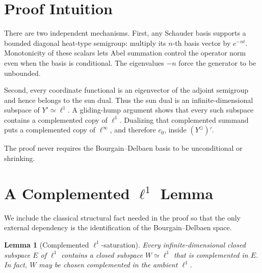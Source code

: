 \documentclass[11pt]{article}
\newtheorem{lemma}{Lemma}
\newcommand{\ellone}{\ell^{1}}
\newcommand{\ellinf}{\ell^{\infty}}
\begin{document}
\section*{Proof Intuition}

There are two independent mechanisms.  First, any Schauder basis supports a
bounded diagonal heat-type semigroup: multiply its \(n\)-th basis vector by
\(e^{-nt}\).  Monotonicity of these scalars lets Abel summation control the
operator norm even when the basis is conditional.  The eigenvalues \(-n\)
force the generator to be unbounded.

Second, every coordinate functional is an eigenvector of the adjoint
semigroup and hence belongs to the sun dual.  Thus the sun dual is an
infinite-dimensional subspace of \(Y'\simeq\ellone\).  A gliding-hump
argument shows that every such subspace contains a complemented copy of
\(\ellone\).  Dualizing that complemented summand puts a complemented copy of
\(\ellinf\), and therefore \(c_0\), inside \((Y^\odot)'\).

The proof never requires the Bourgain--Delbaen basis to be unconditional or
shrinking.

\section*{A Complemented \(\ellone\) Lemma}

We include the classical structural fact needed in the proof so that the only
external dependency is the identification of the Bourgain--Delbaen space.

\begin{lemma}[Complemented \(\ellone\)-saturation]
\label{lem:l1}
Every infinite-dimensional closed subspace \(E\) of \(\ellone\) contains a
closed subspace \(W\simeq\ellone\) that is complemented in \(E\).  In fact,
\(W\) may be chosen complemented in the ambient \(\ellone\).
\end{lemma}
\end{document}

